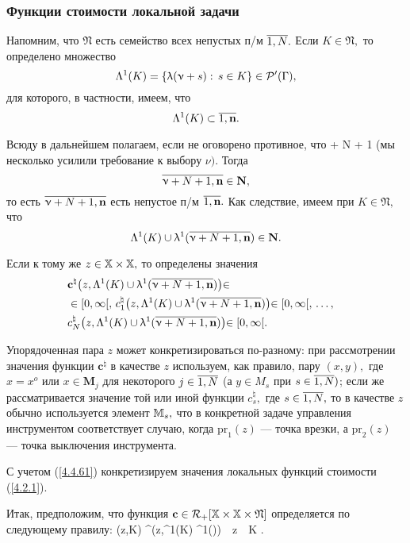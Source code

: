 \subsubsection*{Функции стоимости локальной задачи}

Напомним, что $\mathfrak{N}$
есть семейство всех непустых п/м $\ov{1,N}.$
Если $K\in \mathfrak{N},$
то определено множество
$$
  \Lambda^1(K) = \{\uplambda(\upnu+s):\,s\in K\}\in {\cal P}^\prime(\Gamma)
  ,
$$
для которого, в частности, имеем, что
$$
  \La^1(K) \subset \ov{1,\mathbf{n}}
  .
$$

Всюду в дальнейшем полагаем, если не оговорено противное, что
\bfn
  \label{4.4.60}
  \nu + N + 1 \leqslant {}
\efn
(мы несколько усилили требование к выбору $\nu).$
Тогда
$$
  \ov{\nu+N+1,\mathbf{n}}\in \mathbf{N}
  ,
$$
то есть
$\ov{\nu+N+1,\mathbf{n}}$
есть непустое п/м $\ov{1,\mathbf{n}}.$
Как следствие,
имеем при
$K\in \mathfrak{N},$ что
$$
  \La^1(K) \cup \la^1(\ov{\nu+N+1,\mathbf{n}})\in \mathbf{N}
  .
$$

Если к тому же
$z\in {\mathbb X} \times {\mathbb X},$ то определены значения
\begin{eqnarray}
  &\mathbf{c}^\natural\bigl(z,\La^1(K) \cup \la^1(\ov{\nu+N+1,\mathbf{n}})\bigl)\in
  &\nonumber\\
  &\in[0,\infty[,\,c_1^\natural\bigl(z,\La^1(K) \cup \la^1(\ov{\nu+N+1,\mathbf{n}})\bigl)\in [0,\infty[,
  \,\ldots,
  &\nonumber\\
  &c_N^\natural\bigl(z,\La^1(K) \cup \la^1(\ov{\nu+N+1,\mathbf{n}})\bigl)\in [0,\infty[
  .
  &
  \label{4.4.61}
\end{eqnarray}

Упорядоченная пара $z$ может конкретизироваться по-разному:
при рассмотрении значения функции $\mathbf{c}^\natural$
в качестве  $z$ используем,
как правило, пару $(x,y),$ где
$x= x^o$ или $x\in \mathbf{M}_j$ для некоторого
$j\in\ov{1,N}$
(а $y\in M_s$ при $s\in \ov{1,N})$;
если же рассматривается значение той или иной функции $c_s^\natural,$ где
$s\in \ov{1,N},$
то в качестве $z$ обычно используется элемент ${\mathbb M}_s,$
что в конкретной задаче управления инструментом соответствует случаю, когда
$\mathrm{pr}_1(z)$ --- точка врезки, а
$\mathrm{pr}_2(z)$ --- точка выключения инструмента.

С учетом (\ref{4.4.61})
конкретизируем значения локальных функций стоимости (\ref{4.2.1}).

Итак, предположим, что функция
$\mathbf{c}\in {\cal R}_+[{\mathbb X} \times {\mathbb X} \times \mathfrak{N}]$
определяется по следующему правилу:
\bfn
  \label{4.4.62}
  (z,K) \df {}^\natural\bigl(z,\La^1(K) \cup \la^1()\bigl)\ \ \fa z\in \bbx \times \bbx\ \ \fa K\in {}
  .
\efn

